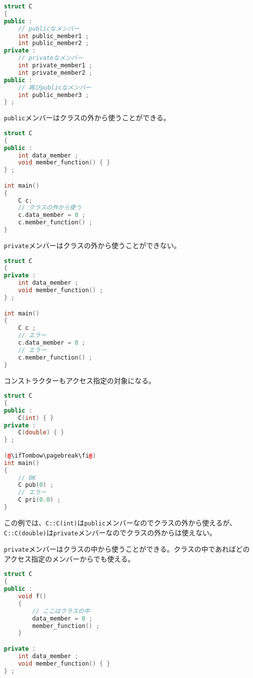 \begin{lstlisting}[language={C++}]
struct C
{
public :
    // publicなメンバー
    int public_member1 ;
    int public_member2 ;
private :
    // privateなメンバー
    int private_member1 ;
    int private_member2 ;
public :
    // 再びpublicなメンバー
    int public_member3 ;    
} ;
\end{lstlisting}

\ifTombow\pagebreak\fi
\texttt{public}メンバーはクラスの外から使うことができる。

\begin{lstlisting}[language={C++}]
struct C
{
public :
    int data_member ;
    void member_function() { }
} ;

int main()
{
    C c;
    // クラスの外から使う
    c.data_member = 0 ;
    c.member_function() ;
}
\end{lstlisting}

\texttt{private}メンバーはクラスの外から使うことができない。

\begin{lstlisting}[language={C++}]
struct C
{
private :
    int data_member ;
    void member_function() ;
} ;

int main()
{
    C c ;
    // エラー
    c.data_member = 0 ;
    // エラー
    c.member_function() ;
}
\end{lstlisting}

コンストラクターもアクセス指定の対象になる。

\begin{lstlisting}[language={C++}]
struct C
{
public :
    C(int) { }
private :
    C(double) { }
} ;

(@\ifTombow\pagebreak\fi@)
int main()
{
    // OK
    C pub(0) ;
    // エラー
    C pri(0.0) ;
}
\end{lstlisting}

この例では、\texttt{C::C(int)}は\texttt{public}メンバーなのでクラスの外から使えるが、\texttt{C::C(double)}は\texttt{private}メンバーなのでクラスの外からは使えない。

\texttt{private}メンバーはクラスの中から使うことができる。クラスの中であればどのアクセス指定のメンバーからでも使える。

\begin{lstlisting}[language={C++}]
struct C
{
public :
    void f()
    {
        // ここはクラスの中
        data_member = 0 ;
        member_function() ;
    }

private :
    int data_member ;
    void member_function() { }
} ;
\end{lstlisting}

